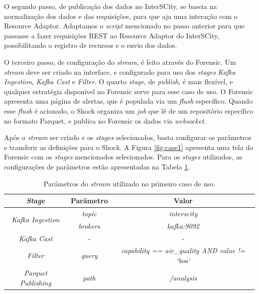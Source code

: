 O segundo passo, de publicação dos dados no InterSCity, se baseia na
normalização dos dados e das requisições, para que aja uma interação com o
Resource Adaptor. Adaptamos o \textit{script} mencionado no passo anterior
para que passasse a fazer requisições REST ao Resource Adaptor do InterSCity,
possibilitando o registro de recursos e o envio dos dados.

O terceiro passo, de configuração do \textit{stream}, é feito através do Forensic.
Um \textit{stream} deve ser criado na interface, e configurado para uso dos
\textit{stages} \textit{Kafka Ingestion}, \textit{Kafka Cast} e \textit{Filter}.
O quarto \textit{stage}, de \textit{publish}, é mais flexível, e qualquer
estratégia disponível no Forensic serve para esse caso de uso. O Forensic
apresenta uma página de alertas, que é populada via um \textit{flush}
específico. Quando esse \textit{flush} é acionado, o Shock organiza um \textit{job}
que lê de um repositório específico no formato Parquet, e publica no Forensic
os dados via \textit{websocket}.



Após o \textit{stream} ser criado e os \textit{stages} selecionados, basta
configurar os parâmetros e transferir as definições para o Shock. A Figura
\ref{fig:case1} apresenta uma tela do Forensic com os \textit{stages}
mencionados selecionados. Para os \textit{stages} utilizados, as
configurações de parâmetros estão apresentadas na Tabela \ref{tab:case1}.

\begin{table}[]
    \centering
    \caption{Parâmetros do \textit{stream} utilizado no primeiro caso de uso.}
    \label{tab:case1}
    \begin{tabular}{|c|c|c|}
        \hline
        \textit{\textbf{Stage}}                   & \textbf{Parâmetro} & \textbf{Valor}                                         \\ \hline
        \multirow{2}{*}{\textit{Kafka Ingestion}} & \textit{topic}     & \textit{interscity}                                    \\ \cline{2-3} 
                                                  & \textit{brokers}   & \textit{kafka:9092}                                    \\ \hline
                                                  \textit{Kafka Cast}                       & -                  & -                                                      \\ \hline
                                                  \textit{Filter}                           & \textit{query}     & \textit{capability == air\_quality AND value != `boa`} \\ \hline
                                                  \textit{Parquet Publishing}               & \textit{path}      & \textit{/analysis}                                     \\ \hline
    \end{tabular}
\end{table}

